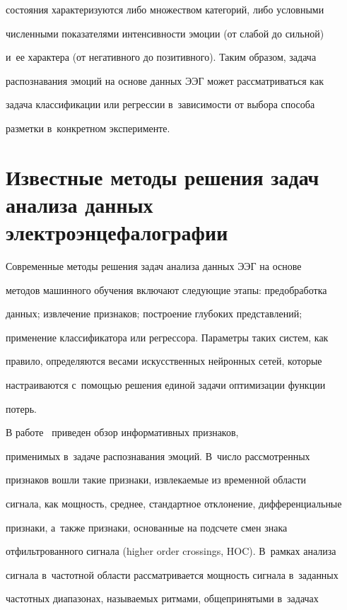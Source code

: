 состояния характеризуются либо множеством категорий, либо условными 

численными показателями ин\-тен\-сив\-ности эмоции (от слабой до сильной) 

и~ее характера (от негативного до позитивного). Таким образом, задача 

распознавания эмоций на основе данных ЭЭГ может рассматриваться как 

задача классификации или регрессии в~зависимости от выбора способа 

разметки в~конкретном эксперименте.



\section{Известные методы решения задач анализа данных электроэнцефалографии}

     

     Современные методы решения задач анализа данных ЭЭГ на основе 

методов машинного обучения включают следующие этапы: предобработка 

данных; извлечение признаков; построение глубоких представлений; 

применение классификатора или регрессора. Параметры таких систем, как 

правило, определяются весами искусственных нейронных сетей, которые 

настраиваются с~помощью решения единой задачи оптимизации функции 

потерь.

     

     В работе~\cite{5-sha} приведен обзор информативных признаков, 

применимых в~задаче распознавания эмоций. В~чис\-ло рас\-смот\-рен\-ных 

признаков вошли такие признаки, из\-вле\-ка\-емые из временной об\-ласти 

сигнала, как мощ\-ность, среднее, стандартное отклонение, дифференциальные 

признаки, а~также признаки, основанные на подсчете смен знака 

отфильтрованного сигнала (higher order crossings, HOC). В~рамках анализа 

сигнала в~частотной области рассматривается мощность сигнала в~заданных 

частотных диапазонах, называемых ритмами, общепринятыми в~задачах 

